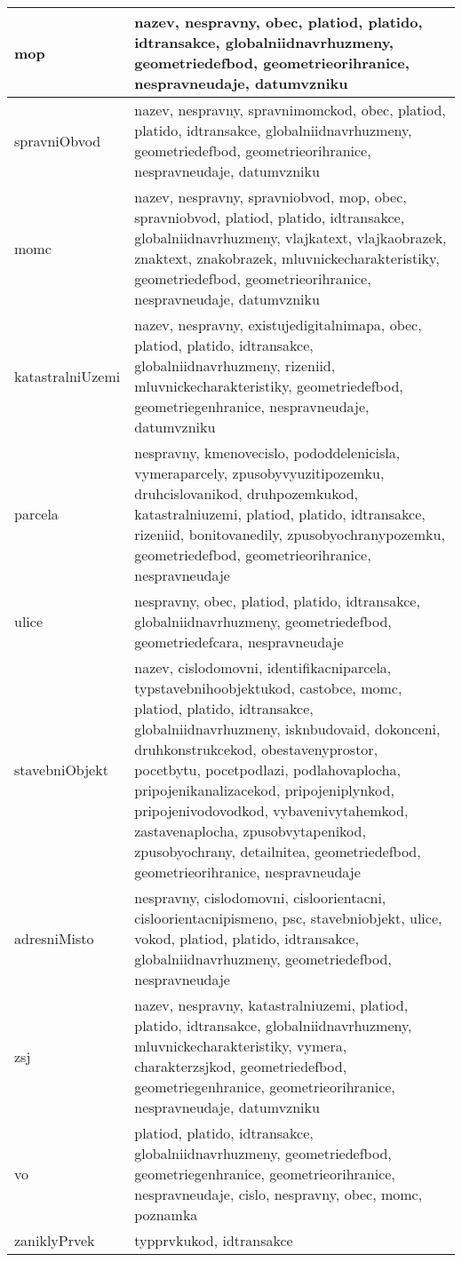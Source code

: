 \begin{center}
\begin{longtable}{|>{\raggedright\arraybackslash}p{4cm}|>{\raggedright\arraybackslash}p{9cm}|}
    \hline
    mop & nazev, nespravny, obec, platiod, platido, idtransakce, globalniidnavrhuzmeny, geometriedefbod, geometrieorihranice, nespravneudaje, datumvzniku \\
    \hline
    spravniObvod & nazev, nespravny, spravnimomckod, obec, platiod, platido, idtransakce, globalniidnavrhuzmeny, geometriedefbod, geometrieorihranice, nespravneudaje, datumvzniku \\
    \hline
    momc & nazev, nespravny, spravniobvod, mop, obec, spravniobvod, platiod, platido, idtransakce, globalniidnavrhuzmeny, vlajkatext, vlajkaobrazek, znaktext, znakobrazek, mluvnickecharakteristiky, geometriedefbod, geometrieorihranice, nespravneudaje, datumvzniku \\
    \hline
    katastralniUzemi & nazev, nespravny, existujedigitalnimapa, obec, platiod, platido, idtransakce, globalniidnavrhuzmeny, rizeniid, mluvnickecharakteristiky, geometriedefbod, geometriegenhranice, nespravneudaje, datumvzniku \\
    \hline
    parcela & nespravny, kmenovecislo, pododdelenicisla, vymeraparcely, zpusobyvyuzitipozemku, druhcislovanikod, druhpozemkukod, katastralniuzemi, platiod, platido, idtransakce, rizeniid, bonitovanedily, zpusobyochranypozemku, geometriedefbod, geometrieorihranice, nespravneudaje \\
    \hline
    ulice & nespravny, obec, platiod, platido, idtransakce, globalniidnavrhuzmeny, geometriedefbod, geometriedefcara, nespravneudaje \\
    \hline
    stavebniObjekt & nazev, cislodomovni, identifikacniparcela, typstavebnihoobjektukod, castobce, momc, platiod, platido, idtransakce, globalniidnavrhuzmeny, isknbudovaid, dokonceni, druhkonstrukcekod, obestavenyprostor, pocetbytu, pocetpodlazi, podlahovaplocha, pripojenikanalizacekod, pripojeniplynkod, pripojenivodovodkod, vybavenivytahemkod, zastavenaplocha, zpusobvytapenikod, zpusobyochrany, detailnitea, geometriedefbod, geometrieorihranice, nespravneudaje \\
    \hline
    adresniMisto & nespravny, cislodomovni, cisloorientacni, cisloorientacnipismeno, psc, stavebniobjekt, ulice, vokod, platiod, platido, idtransakce, globalniidnavrhuzmeny, geometriedefbod, nespravneudaje \\
    \hline
    zsj & nazev, nespravny, katastralniuzemi, platiod, platido, idtransakce, globalniidnavrhuzmeny, mluvnickecharakteristiky, vymera, charakterzsjkod, geometriedefbod, geometriegenhranice, geometrieorihranice, nespravneudaje, datumvzniku \\
    \hline
    vo & platiod, platido, idtransakce, globalniidnavrhuzmeny, geometriedefbod, geometriegenhranice, geometrieorihranice, nespravneudaje, cislo, nespravny, obec, momc, poznamka \\
    \hline
    zaniklyPrvek & typprvkukod, idtransakce \\
    \hline
    
  \end{longtable}
\end{center}

